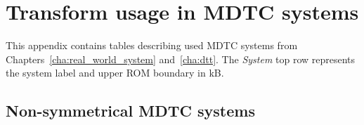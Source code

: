\documentclass[11pt,a4paper,openright,twoside]{book}
\numberwithin{equation}{section} %
\numberwithin{figure}{section} %
\numberwithin{table}{section} %
\begin{document}

\chapter{Transform usage in \acs{MDTC} systems}
\label{cha:transform_usage_in_mdtc_systems}

This appendix contains tables describing used \ac{MDTC} systems from
Chapters~\ref{cha:real_world_system} and~\ref{cha:dtt}.
The \emph{System} top row represents the system label and upper \acs{ROM}
boundary in kB.

\section*{Non-symmetrical \acs{MDTC} systems}
\label{sec:non_symmetrical_mdtc_systems}
\end{document}
